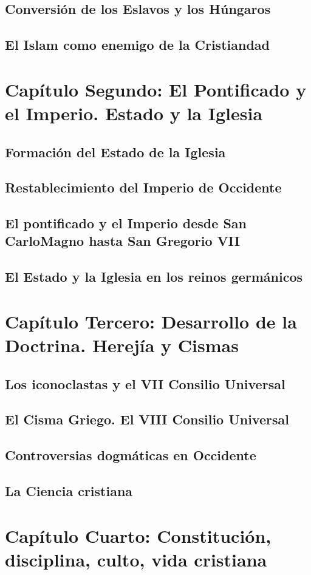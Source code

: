 \raggedbottom{} \documentclass[12pt, a4paper]{book}
\begin{document}
\section{Conversión de los Eslavos y los Húngaros}
\section{El Islam como enemigo de la Cristiandad}
\chapter{Capítulo Segundo: El Pontificado y el Imperio. Estado y la Iglesia}
\section{Formación del Estado de la Iglesia}
\section{Restablecimiento del Imperio de Occidente}
\section{El pontificado y el Imperio desde San CarloMagno hasta San Gregorio VII}
\section{El Estado y la Iglesia en los reinos germánicos}
\chapter{Capítulo Tercero: Desarrollo de la Doctrina. Herejía y Cismas}
\section{Los iconoclastas y el VII Consilio Universal}
\section{El Cisma Griego. El VIII Consilio Universal}
\section{Controversias dogmáticas en Occidente}
\section{La Ciencia cristiana}
\chapter{Capítulo Cuarto: Constitución, disciplina, culto, vida cristiana}
\end{document}
